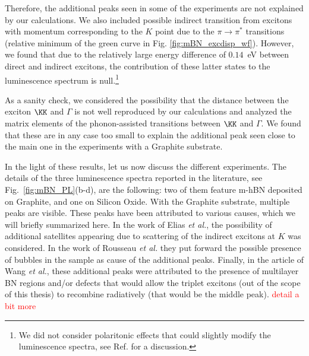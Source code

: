 Therefore, the additional peaks seen in some of the experiments are not explained by our calculations. We also included possible indirect transition from excitons with momentum corresponding to the $K$ point due to the $\pi \rightarrow \pi^*$ transitions (relative minimum of the green curve in Fig. \ref{fig:mBN_excdisp_wf}). However, we found that due to the relatively large energy difference of $0.14$~eV between direct and indirect excitons, the contribution of these latter states to the luminescence spectrum is null.\footnote{We did not consider polaritonic effects that could slightly modify the luminescence spectra, see Ref. \cite{henriques2019optical} for a discussion.}

As a sanity check, we considered the possibility that the distance between the exciton $\KK$ and $\Gamma$ is not well reproduced by our calculations and analyzed the matrix elements of the phonon-assisted transitions between $\KK$ and $\Gamma$. We found that these are in any case too small to explain the additional peak seen close to the main one in the experiments with a Graphite substrate.

In the light of these results, let us now discuss the different experiments. The details of the three luminescence spectra reported in the literature, see Fig.~\ref{fig:mBN_PL}(b-d), are the following: two of them feature m-hBN deposited on Graphite,\cite{elias2019direct,wang2022scalable} and one on Silicon Oxide.\cite{rousseau2021monolayer}
With the Graphite substrate, multiple peaks are visible.
These peaks have been attributed to various causes, which we will briefly summarized here. In the work of Elias \emph{et al.},\cite{elias2019direct} the possibility of additional satellites appearing due to scattering of the indirect excitons at $K$ was considered.
In the work of Rousseau \emph{et al.}\cite{rousseau2021monolayer} they put forward the possible presence of bubbles in the sample as cause of the additional peaks. 
Finally, in the article of Wang \emph{et al.}\cite{wang2022scalable}, these additional peaks were attributed to the presence of multilayer BN regions and/or defects that would allow the triplet excitons (out of the scope of this thesis) to recombine radiatively (that would be the middle peak). \textcolor{red}{detail a bit more}


